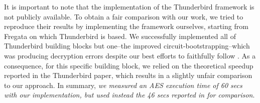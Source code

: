 It is important to note that the implementation of the Thunderbird framework is not publicly available. To obtain a fair comparison with our work, we tried to reproduce their results by implementing the framework ourselves, starting from Fregata on which Thunderbird is based. We successfully implemented all of Thunderbird building blocks but one--the improved circuit-bootstrapping--which was producing decryption errors despite our best efforts to faithfully follow \cite{TCHES:WLWLLW24}. As a consequence, for this specific building block, we relied on the theoretical speedup reported in the Thunderbird paper, which results in a slightly unfair comparison to our approach. In summary, \emph{we measured an \gls{AES} execution time of 60 secs with our implementation, but used instead the 46 secs reported in \cite{TCHES:WLWLLW24} for comparison}. 

\begin{comment}
\DT{Despite our best efforts to faithfully follow the Thunderbird paper, our implementation of their framework} (using the most efficient \texttt{FreeXOR} variant) still induced unexpected decryption errors. \DT{Looking for comparison figures, we still executed it and obtained an \gls{AES} execution in 60 secs, which was a bit slower than the 46 seconds reported by the authors.} This hints that our machine is approximately 1.3 times slower than the one used in their paper (a ratio which is further confirmed by lower-grain unitary measurements on the circuit bootstrapping alone). \DT{Finally, as our implementation did not always produce correct results, we choose not to rely on it for comparison.} 
As a consequence, for this specific building block only, we relied on the theoretical speedup reported in the Thunderbird paper, which results in a slightly unfair comparison to our approach. \emph{As a result, comparing the execution times of our new framework to those reported in the Thunderbird paper (i.e. 46 secs) may slightly disadvantage \hippo.}
\NB{On a dit dans le rebuttal qu'on améliorerait cette section} \DT{J'ai fait quelques ajouts en partant de notre réponse de rebuttal, mais je ne sais pas si c'est vraiment plus clair qu'auparavant...}
\end{comment}


